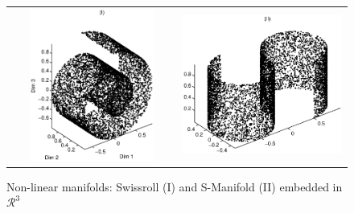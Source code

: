 \begin{figure}
\centering
\begin{tabular}{cc}
\includegraphics[width=60mm,height=50mm]{Swissroll.eps} & \includegraphics[width=60mm,height=50mm]{SManifold.eps}
\end{tabular}
\caption{Non-linear manifolds: Swissroll (I) and S-Manifold (II) embedded in $\mathcal{R}^3$} \label{manifold:nonlinear}
\end{figure}



 
 



